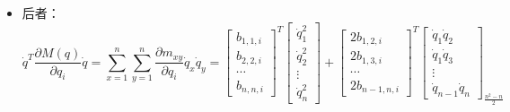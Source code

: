 \documentclass[
12pt, %
a4paper, 
oneside, %
]{scrartcl}
\begin{document}
\begin{itemize}
其中$ p_i = \sum_{x = 1}^n \sum_{y = 1}^n \frac{\partial m_{ix}}{\partial q_y}\dot{q}_x \dot{q}_y $，$ x = y $的项对应离心力，$ x \neq y $的项对应科里奥利力。可转化为：
$$
\textcolor{red}{\dot{M}(q) \dot{q}} = \begin{bmatrix} b_{1,1,1} & b_{1,2,2} & \cdots & b_{1,n,n} \\ b_{2,1,1} & b_{2,2,2} & \cdots & b_{2,n,n} \\ \vdots & \vdots & \ddots & \vdots \\ b_{n,1,1} & b_{n,2,2} & \cdots & b_{n,n,n} \end{bmatrix}
\begin{bmatrix} \dot{q}_1^2 \\ \dot{q}_2^2 \\ \vdots \\ \dot{q}_n^2 \end{bmatrix}
+ \begin{bmatrix} c_{1,1 2} & c_{1,1 3} & \cdots & c_{1,n - 1 n} \\ c_{2,1 2} & c_{2,1 3} & \cdots & c_{2,n - 1 n} \\ \vdots & \vdots & \ddots & \vdots \\ c_{n,1 2} & c_{n,1 3} & \cdots & c_{n,n - 1 n} \end{bmatrix}_{n \times \frac{n^2 - n}{2}}
\begin{bmatrix} \dot{q}_1 \dot{q}_2 \\ \dot{q}_1 \dot{q}_3 \\ \vdots \\ \dot{q}_{n - 1} \dot{q}_n \end{bmatrix}_{\frac{n^2 - n}{2}}
$$
\item 后者：
$$ 
\dot{q}^T \frac{\partial M(q)}{\partial q_i}\dot{q} = \sum_{x = 1}^n \sum_{y = 1}^n \frac{\partial m_{xy}}{\partial q_i}\dot{q}_x \dot{q}_y 
= \begin{bmatrix} b_{1,1,i} \\ b_{2,2,i} \\ \cdots \\ b_{n,n,i} \end{bmatrix}^T \begin{bmatrix} \dot{q}_1^2 \\ \dot{q}_2^2 \\ \vdots \\ \dot{q}_n^2 \end{bmatrix}
+ \begin{bmatrix} 2b_{1,2,i} \\ 2b_{1,3,i} \\ \cdots \\ 2b_{n - 1,n,i} \end{bmatrix}^T \begin{bmatrix} \dot{q}_1 \dot{q}_2 \\ \dot{q}_1 \dot{q}_3 \\ \vdots \\ \dot{q}_{n - 1} \dot{q}_n \end{bmatrix}_{\frac{n^2 - n}{2}}
$$


\end{itemize}
\end{document}
